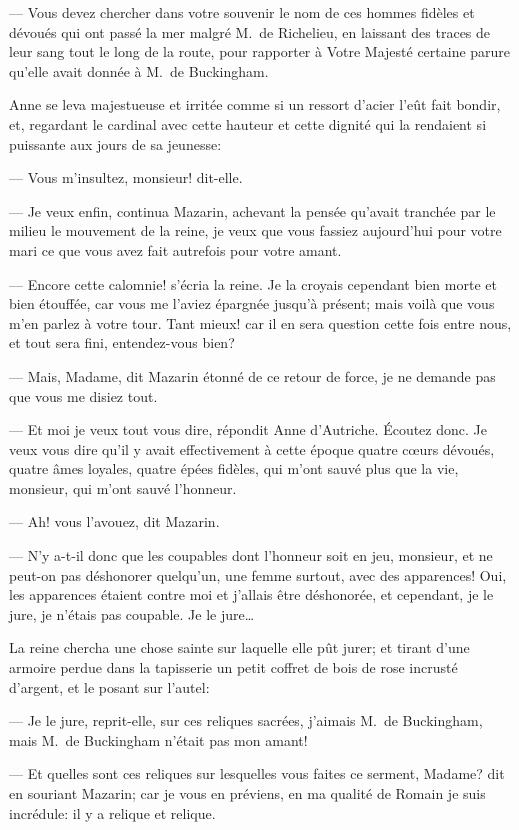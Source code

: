 — Vous devez chercher dans votre souvenir le nom de ces hommes fidèles et dévoués qui ont passé la mer malgré M.~de Richelieu, en laissant des traces de leur sang tout le long de la route, pour rapporter à Votre Majesté certaine parure qu'elle avait donnée à M.~de Buckingham.

Anne se leva majestueuse et irritée comme si un ressort d'acier l'eût fait bondir, et, regardant le cardinal avec cette hauteur et cette dignité qui la rendaient si puissante aux jours de sa jeunesse:

— Vous m'insultez, monsieur! dit-elle.

— Je veux enfin, continua Mazarin, achevant la pensée qu'avait tranchée par le milieu le mouvement de la reine, je veux que vous fassiez aujourd'hui pour votre mari ce que vous avez fait autrefois pour votre amant.

— Encore cette calomnie! s'écria la reine. Je la croyais cependant bien morte et bien étouffée, car vous me l'aviez épargnée jusqu'à présent; mais voilà que vous m'en parlez à votre tour. Tant mieux! car il en sera question cette fois entre nous, et tout sera fini, entendez-vous bien?

— Mais, Madame, dit Mazarin étonné de ce retour de force, je ne demande pas que vous me disiez tout.

— Et moi je veux tout vous dire, répondit Anne d'Autriche. Écoutez donc. Je veux vous dire qu'il y avait effectivement à cette époque quatre cœurs dévoués, quatre âmes loyales, quatre épées fidèles, qui m'ont sauvé plus que la vie, monsieur, qui m'ont sauvé l'honneur.

— Ah! vous l'avouez, dit Mazarin.

— N'y a-t-il donc que les coupables dont l'honneur soit en jeu, monsieur, et ne peut-on pas déshonorer quelqu'un, une femme surtout, avec des apparences! Oui, les apparences étaient contre moi et j'allais être déshonorée, et cependant, je le jure, je n'étais pas coupable. Je le jure\dots

La reine chercha une chose sainte sur laquelle elle pût jurer; et tirant d'une armoire perdue dans la tapisserie un petit coffret de bois de rose incrusté d'argent, et le posant sur l'autel:

— Je le jure, reprit-elle, sur ces reliques sacrées, j'aimais M.~de Buckingham, mais M.~de Buckingham n'était pas mon amant!

— Et quelles sont ces reliques sur lesquelles vous faites ce serment, Madame? dit en souriant Mazarin; car je vous en préviens, en ma qualité de Romain je suis incrédule: il y a relique et relique.

